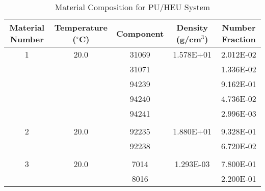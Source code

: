 \begin{table}[!htbp]
	\caption{Material Composition for PU/HEU System}
	\label{table:MIX}
		\centering{}
		\begin{tabular}{@{}ccccc@{}}\toprule
			Material Number & Temperature ($^{\circ}$C) & Component & Density (g/cm$^{3}$) & Number Fraction \\ 
        			\midrule
         1  &  20.0  &  31069    &     1.578E+01 &  2.012E-02 \\
            &          &  31071    &               &  1.336E-02 \\
            &          &  94239    &               &  9.162E-01 \\
            &          &  94240    &               &  4.736E-02 \\
            &          &  94241    &               &  2.996E-03 \\
            & & & & \\
          2  &  20.0  &  92235    &     1.880E+01 &  9.328E-01 \\
            &          &  92238    &               &  6.720E-02 \\
                        & & & & \\
          3    & 20.0  &  7014    &      1.293E-03   & 7.800E-01\\
              & & 8016              & &        2.200E-01 \\
		\bottomrule
		\end{tabular}
\end{table}

